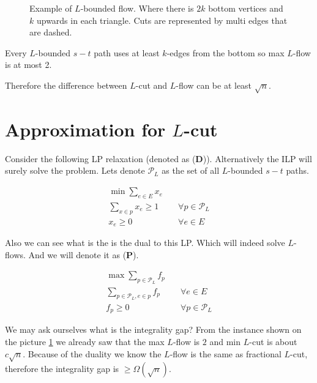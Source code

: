 \begin{figure}[!ht]
	\caption{Example of $L$-bounded flow. Where there is $2k$ bottom vertices and $k$ upwards in each triangle. Cuts are represented by multi edges that are dashed.}
	\label{l-bounded flow}
\end{figure}

\begin{observ}
	Every $L$-bounded $s-t$ path uses at least $k$-edges from the bottom so max $L$-flow is at most 2.
\end{observ}

Therefore the difference between $L$-cut and $L$-flow can be at least $\sqrt{n}$.

\section{Approximation for $L$-cut}

Consider the following LP relaxation (denoted as (\textbf{D})). Alternatively the ILP will surely solve the problem. Lets denote $\mathcal{P}_L$ as the set of all $L$-bounded $s-t$ paths.

$$
\begin{aligned}
	\min \sum_{e \in E} x_e & \\
	\sum_{x \in p} x_e \geq 1 & \quad \forall p \in \mathcal{P}_L \\
	x_e \geq 0 & \quad \forall e \in E
\end{aligned}
$$

Also we can see what is the is the dual to this LP. Which will indeed solve $L$-flows. And we will denote it as (\textbf{P}).

$$
\begin{aligned}
	\max \sum_{p \in \mathcal{P}_L} f_p &\\
	\sum_{p \in \mathcal{P}_L, e \in p} f_p & \quad \forall e \in E\\
	f_p \geq 0 & \quad \forall p \in \mathcal{P}_L
\end{aligned}
$$

We may ask ourselves what is the integrality gap? From the instance shown on the picture \ref{l-bounded flow} we already saw that the max $L$-flow is $2$ and min $L$-cut is about $c \sqrt{n}$. Because of the duality we know the $L$-flow is the same as fractional $L$-cut, therefore the integrality gap is $\geq \Omega (\sqrt{n})$.

